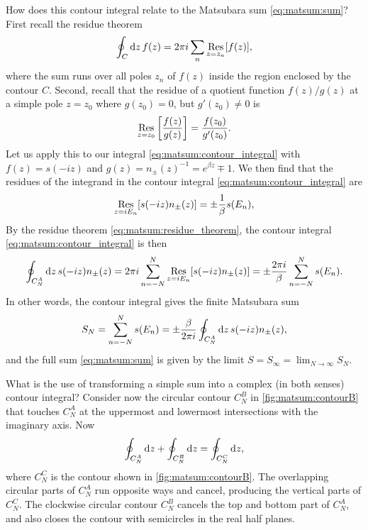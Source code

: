 How does this contour integral relate to the Matsubara sum \eqref{eq:matsum:sum}?
First recall the residue theorem
\begin{equation}
	\oint_C \mathop{}\!\mathrm{d} z \, f(z) = 2 \pi i \sum_n \operatorname*{Res}_{z=z_n} [f(z)] ,
\label{eq:matsum:residue_theorem}
\end{equation}
where the sum runs over all poles $z_n$ of $f(z)$ inside the region enclosed by the contour $C$.
Second, recall that the residue of a quotient function $f(z) / g(z)$ at a simple pole $z = z_0$ where $g(z_0) = 0$, but $g'(z_0) \neq 0$ is 
\begin{equation}
	\operatorname*{Res}_{z=z_0} \left[ \frac{f(z)}{g(z)} \right] = \frac{f(z_0)}{g'(z_0)} .
\label{eq:matsum:residue_quotient}
\end{equation}
Let us apply this to our integral \eqref{eq:matsum:contour_integral} with $f(z) = s(-iz)$ and $g(z) = n_\pm(z)^{-1} = e^{\beta z} \mp 1$.
We then find that the residues of the integrand in the contour integral \eqref{eq:matsum:contour_integral} are
\begin{equation}
	\operatorname*{Res}_{z = i E_n} [s(-iz) n_\pm(z)] = \pm \frac{1}{\beta} s(E_n) ,
\end{equation}
By the residue theorem \eqref{eq:matsum:residue_theorem}, the contour integral \eqref{eq:matsum:contour_integral} is then
\begin{equation}
	\oint_{C_N^A} \mathop{}\!\mathrm{d} z \, s(-iz) n_\pm(z) = 2 \pi i \sum_{n=-N}^N \operatorname*{Res}_{z = i E_n}[s(-i z) n_\pm(z)]
	                                  = \pm \frac{2 \pi i}{\beta} \sum_{n=-N}^N s(E_n) .
\label{eq:matsum:connection_integral_sum}
\end{equation}
In other words, the contour integral gives the finite Matsubara sum
\begin{equation}
	S_N = \sum_{n=-N}^N s(E_n) = \pm \frac{\beta}{2 \pi i} \oint_{C_N^A} \mathop{}\!\mathrm{d} z \, s(-iz) n_\pm(z) ,
\label{eq:matsum:sum_as_contour_integral}
\end{equation}
and the full sum \eqref{eq:matsum:sum} is given by the limit $S = S_\infty = \lim_{N \rightarrow \infty} S_N$.

What is the use of transforming a simple sum into a complex (in both senses) contour integral?
Consider now the circular contour $C_N^B$ in \cref{fig:matsum:contourB} that touches $C_N^A$ at the uppermost and lowermost intersections with the imaginary axis.
Now
\begin{equation}
	\oint_{C_N^A} \mathop{}\!\mathrm{d} z +
	\oint_{C_N^B} \mathop{}\!\mathrm{d} z =
	\oint_{C_N^C} \mathop{}\!\mathrm{d} z ,
\label{eq:matsum:contour_superposition}
\end{equation}
where $C_N^C$ is the contour shown in \cref{fig:matsum:contourB}.
The overlapping circular parts of $C_N^A$ run opposite ways and cancel, producing the vertical parts of $C_N^C$.
The clockwise circular contour $C_N^B$ cancels the top and bottom part of $C_N^A$, and also closes the contour with semicircles in the real half planes.

